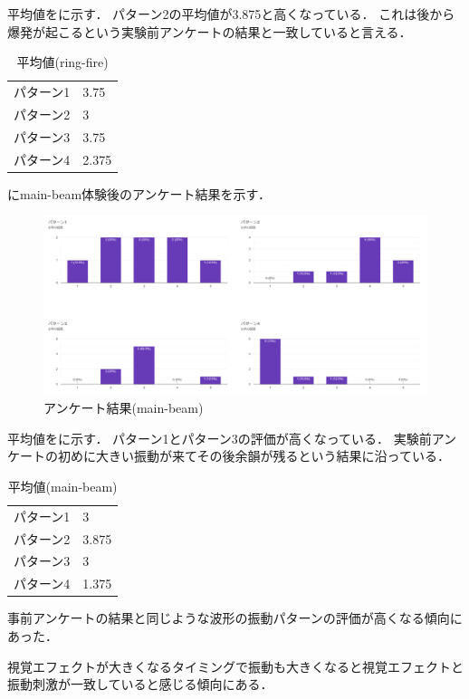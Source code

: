平均値をに示す．
パターン2の平均値が3.875と高くなっている．
これは後から爆発が起こるという実験前アンケートの結果と一致していると言える．

\begin{table}[h]
    \caption{平均値(ring-fire)}
    \centering
    \begin{tabular}{l|l}
    \hline
    \hline
    パターン1 & 3.75\\
    パターン2 & 3\\
    パターン3 & 3.75\\
    パターン4 & 2.375\\
    \hline
    \end{tabular}
    \label{tab;ringAve}
\end{table}

にmain-beam体験後のアンケート結果を示す．

\begin{figure}[h]
  \centering
  \includegraphics[clip,width=14cm]{fig/mainbeamAnk.png}
  \caption{アンケート結果(main-beam)}\label{mainAnk}
  \end{figure}


平均値をに示す．
パターン1とパターン3の評価が高くなっている．
実験前アンケートの初めに大きい振動が来てその後余韻が残るという結果に沿っている．

  \begin{table}[H]
    \caption{平均値(main-beam)}
    \centering
    \begin{tabular}{l|l}
    \hline
    \hline
    パターン1 & 3\\
    パターン2 & 3.875\\
    パターン3 & 3\\
    パターン4 & 1.375\\
    \hline
    \end{tabular}
    \label{tab;mainAve}
\end{table}

事前アンケートの結果と同じような波形の振動パターンの評価が高くなる傾向にあった．

視覚エフェクトが大きくなるタイミングで振動も大きくなると視覚エフェクトと振動刺激が一致していると感じる傾向にある．


